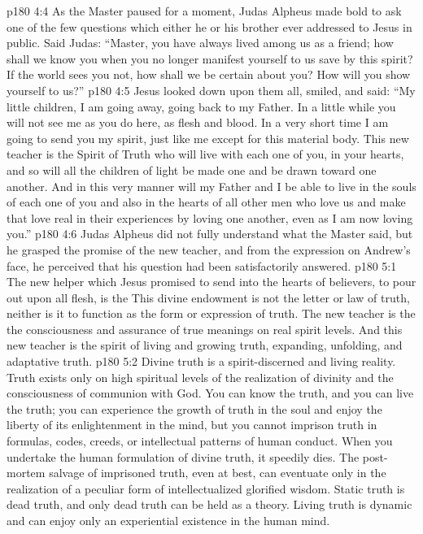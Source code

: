 \vs p180 4:4 As the Master paused for a moment, Judas Alpheus made bold to ask one of the few questions which either he or his brother ever addressed to Jesus in public. Said Judas: “Master, you have always lived among us as a friend; how shall we know you when you no longer manifest yourself to us save by this spirit? If the world sees you not, how shall we be certain about you? How will you show yourself to us?”
\vs p180 4:5 Jesus looked down upon them all, smiled, and said: \textcolor{ubdarkred}{“My little children, I am going away, going back to my Father. In a little while you will not see me as you do here, as flesh and blood. In a very short time I am going to send you my spirit, just like me except for this material body. This new teacher is the Spirit of Truth who will live with each one of you, in your hearts, and so will all the children of light be made one and be drawn toward one another. And in this very manner will my Father and I be able to live in the souls of each one of you and also in the hearts of all other men who love us and make that love real in their experiences by loving one another, even as I am now loving you.”}\plusone
\vs p180 4:6 Judas Alpheus did not fully understand what the Master said, but he grasped the promise of the new teacher, and from the expression on Andrew’s face, he perceived that his question had been satisfactorily answered.
\vs p180 5:1 The new helper which Jesus promised to send into the hearts of believers, to pour out upon all flesh, is the  This divine endowment is not the letter or law of truth, neither is it to function as the form or expression of truth. The new teacher is the  the consciousness and assurance of true meanings on real spirit levels. And this new teacher is the spirit of living and growing truth, expanding, unfolding, and adaptative truth.
\vs p180 5:2 Divine truth is a spirit\hyp{}discerned and living reality. Truth exists only on high spiritual levels of the realization of divinity and the consciousness of communion with God. You can know the truth, and you can live the truth; you can experience the growth of truth in the soul and enjoy the liberty of its enlightenment in the mind, but you cannot imprison truth in formulas, codes, creeds, or intellectual patterns of human conduct. When you undertake the human formulation of divine truth, it speedily dies. The post\hyp{}mortem salvage of imprisoned truth, even at best, can eventuate only in the realization of a peculiar form of intellectualized glorified wisdom. Static truth is dead truth, and only dead truth can be held as a theory. Living truth is dynamic and can enjoy only an experiential existence in the human mind.
